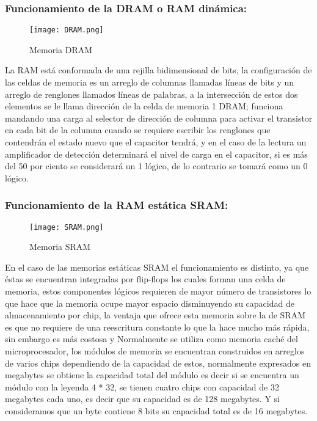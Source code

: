 \documentclass{article}
\begin{document}
\subsubsection{Funcionamiento de la DRAM o RAM dinámica:}

\begin{figure}[h]
\texttt{[image: DRAM.png]}
\centering
\caption{Memoria DRAM}
\label{fig:Memoria DRAM}
\end{figure}


La RAM está conformada de una rejilla bidimensional de bits, la configuración de las celdas de memoria es un arreglo de columnas llamadas líneas de bits y un arreglo de renglones llamados líneas de palabras, a la intersección de estos dos elementos se le llama dirección de la celda de memoria 1 DRAM; funciona mandando una carga al selector de dirección de columna para activar el transistor en cada bit de la columna cuando se requiere escribir los renglones que contendrán el estado nuevo que el capacitor tendrá, y en el caso de la lectura un amplificador de detección determinará el nivel de carga en el capacitor, si es más del 50 por ciento se considerará un 1 lógico, de lo contrario se tomará como un 0 lógico.

\subsubsection{Funcionamiento de la RAM estática SRAM:}

\begin{figure}[h]
\texttt{[image: SRAM.png]}
\centering
\caption{Memoria SRAM}
\label{fig:Memoria SRAM}
\end{figure}


En el caso de las memorias estáticas SRAM el funcionamiento es distinto, ya que éstas se encuentran integradas por flip-flops los cuales forman una celda de memoria, estos componentes lógicos requieren de mayor número de transistores lo que hace que la memoria ocupe mayor espacio disminuyendo su capacidad de almacenamiento por chip, la ventaja que ofrece esta memoria sobre la de SRAM es que no requiere de una reescritura constante lo que la hace mucho más rápida, sin embargo es más costosa y Normalmente se utiliza como memoria caché del microprocesador, los módulos de memoria se encuentran construidos en arreglos de varios chips dependiendo de la capacidad de estos, normalmente expresados en megabytes se obtiene la capacidad total del módulo es decir si se encuentra un módulo con la leyenda 4 * 32, se tienen cuatro chips con capacidad de 32 megabytes cada uno, es decir que su capacidad es de 128 megabytes. Y si consideramos que un byte contiene 8 bits su capacidad total es de 16 megabytes.
\end{document}
